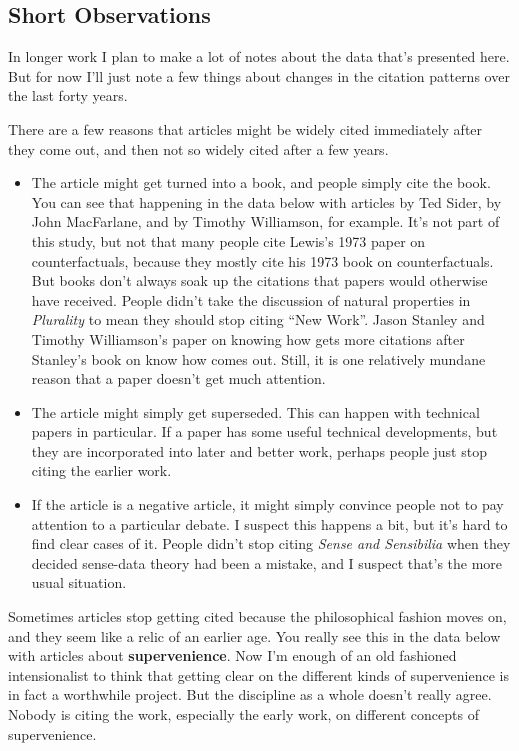 \documentclass[
  10pt,
  letterpaper,
  DIV=11,
  numbers=noendperiod,
  twoside]{scrartcl}
\providecommand{\tightlist}{%
  \setlength{\itemsep}{0pt}\setlength{\parskip}{0pt}}\usepackage{longtable,booktabs,array}
\begin{document}
\subsection{Short Observations}\label{short-observations}

In longer work I plan to make a lot of notes about the data that's
presented here. But for now I'll just note a few things about changes in
the citation patterns over the last forty years.

There are a few reasons that articles might be widely cited immediately
after they come out, and then not so widely cited after a few years.

\begin{itemize}
\tightlist
\item
  The article might get turned into a book, and people simply cite the
  book. You can see that happening in the data below with articles by
  Ted Sider, by John MacFarlane, and by Timothy Williamson, for example.
  It's not part of this study, but not that many people cite Lewis's
  1973 paper on counterfactuals, because they mostly cite his 1973 book
  on counterfactuals. But books don't always soak up the citations that
  papers would otherwise have received. People didn't take the
  discussion of natural properties in \emph{Plurality} to mean they
  should stop citing ``New Work''. Jason Stanley and Timothy
  Williamson's paper on knowing how gets more citations after Stanley's
  book on know how comes out. Still, it is one relatively mundane reason
  that a paper doesn't get much attention.
\item
  The article might simply get superseded. This can happen with
  technical papers in particular. If a paper has some useful technical
  developments, but they are incorporated into later and better work,
  perhaps people just stop citing the earlier work.
\item
  If the article is a negative article, it might simply convince people
  not to pay attention to a particular debate. I suspect this happens a
  bit, but it's hard to find clear cases of it. People didn't stop
  citing \emph{Sense and Sensibilia} when they decided sense-data theory
  had been a mistake, and I suspect that's the more usual situation.
\end{itemize}

Sometimes articles stop getting cited because the philosophical fashion
moves on, and they seem like a relic of an earlier age. You really see
this in the data below with articles about \textbf{supervenience}. Now
I'm enough of an old fashioned intensionalist to think that getting
clear on the different kinds of supervenience is in fact a worthwhile
project. But the discipline as a whole doesn't really agree. Nobody is
citing the work, especially the early work, on different concepts of
supervenience.
\end{document}
